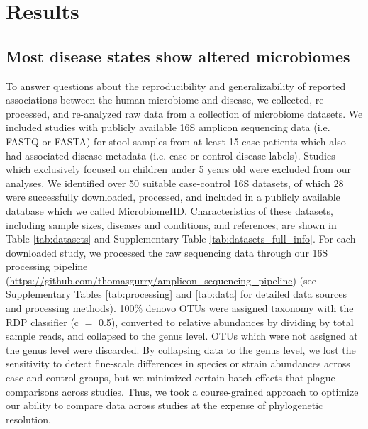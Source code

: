 \documentclass{article}
\begin{document}
\section*{Results}

\subsection*{Most disease states show altered microbiomes}

To answer questions about the reproducibility and generalizability of reported associations between the human microbiome and disease, we collected, re-processed, and re-analyzed raw data from a collection of microbiome datasets.
We included studies with publicly available 16S amplicon sequencing data (i.e. FASTQ or FASTA) for stool samples from at least 15 case patients which also had associated disease metadata (i.e. case or control disease labels).
Studies which exclusively focused on children under 5 years old were excluded from our analyses.
We identified over 50 suitable case-control 16S datasets, of which 28 were successfully downloaded, processed, and included in a publicly available database which we called MicrobiomeHD\cite{microbiomehd}.
Characteristics of these datasets, including sample sizes, diseases and conditions, and references, are shown in Table \ref{tab:datasets} and Supplementary Table \ref{tab:datasets_full_info}.
For each downloaded study, we processed the raw sequencing data through our 16S processing pipeline (\url{https://github.com/thomasgurry/amplicon_sequencing_pipeline}) (see Supplementary Tables \ref{tab:processing} and \ref{tab:data} for detailed data sources and processing methods).
100\% denovo OTUs were assigned taxonomy with the RDP classifier \cite{wang2007naive} (c $=$ 0.5), converted to relative abundances by dividing by total sample reads, and collapsed to the genus level. OTUs which were not assigned at the genus level were discarded. 
By collapsing data to the genus level, we lost the sensitivity to detect fine-scale differences in species or strain abundances across case and control groups, but we minimized certain batch effects that plague comparisons across studies. 
Thus, we took a course-grained approach to optimize our ability to compare data across studies at the expense of phylogenetic resolution.
\end{document}
